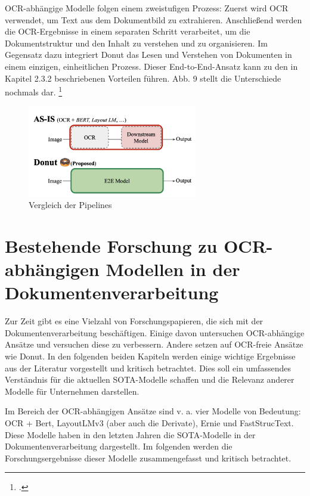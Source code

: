 OCR-abhängige Modelle folgen einem zweistufigen Prozess: Zuerst wird OCR verwendet, um Text aus dem Dokumentbild zu extrahieren. Anschließend werden die OCR-Ergebnisse in einem separaten Schritt verarbeitet, um die Dokumentstruktur und den Inhalt zu verstehen und zu organisieren. Im Gegensatz dazu integriert Donut das Lesen und Verstehen von Dokumenten in einem einzigen, einheitlichen Prozess. Dieser End-to-End-Ansatz kann zu den in Kapitel 2.3.2 beschriebenen Vorteilen führen. Abb. 9 stellt die Unterschiede nochmals dar. \footcites[Vgl.][S. 2 f.]{kim_ocr-free_2021}
\begin{figure}[h]
    \centering
    \includegraphics[height=40mm]{graphics/e2e.png}
    \caption[Vergleich der Pipelines]{Vergleich der Pipelines\footnotemark}
    \label{fig:pipelines}
\end{figure}

\section{Bestehende Forschung zu OCR-abhängigen Modellen in der Dokumentenverarbeitung}
Zur Zeit gibt es eine Vielzahl von Forschungspapieren, die sich mit der Dokumentenverarbeitung beschäftigen. Einige davon untersuchen OCR-abhängige Ansätze und versuchen diese zu verbessern. Andere setzen auf OCR-freie Ansätze wie Donut. In den folgenden beiden Kapiteln werden einige wichtige Ergebnisse aus der Literatur vorgestellt und kritisch betrachtet. Dies soll ein umfassendes Verständnis für die aktuellen SOTA-Modelle schaffen und die Relevanz anderer Modelle für Unternehmen darstellen.

Im Bereich der OCR-abhängigen Ansätze sind v. a. vier Modelle von Bedeutung: OCR + Bert, LayoutLMv3 (aber auch die Derivate), Ernie und FastStrucText. Diese Modelle haben in den letzten Jahren die SOTA-Modelle in der Dokumentenverarbeitung dargestellt. Im folgenden werden die Forschungsergebnisse dieser Modelle zusammengefasst und kritisch betrachtet.

